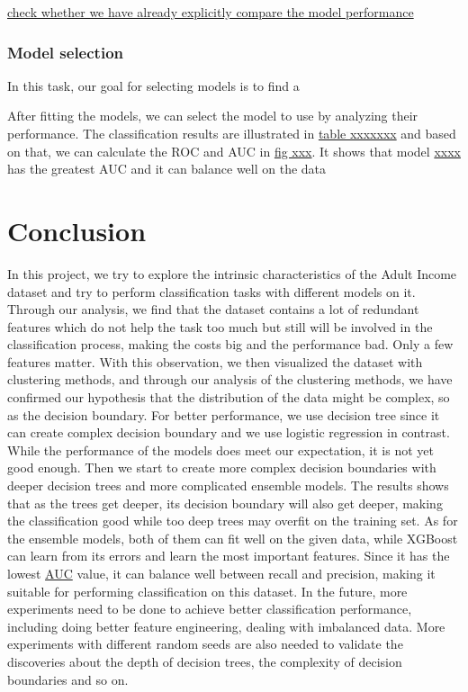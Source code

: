 \documentclass{article}
\begin{document}
\underline{check whether we have already explicitly compare the model performance}

\subsubsection*{Model selection}



In this task, our goal for selecting models is to find a 

After fitting the models, we can select the model to use by analyzing their performance. The classification results are illustrated in \underline{table xxxxxxx} and based on that, we can calculate the ROC and AUC in \underline{fig xxx}. It shows that model \underline{xxxx} has the greatest AUC and it can balance well on the data


\section{Conclusion}

In this project, we try to explore the intrinsic characteristics of the Adult Income dataset and try to perform classification tasks with different models on it. Through our analysis, we find that the dataset contains a lot of redundant features which do not help the task too much but still will be involved in the classification process, making the costs big and the performance bad. Only a few features matter. With this observation, we then visualized the dataset with clustering methods, and through our analysis of the clustering methods, we have confirmed our hypothesis that the distribution of the data might be complex, so as the decision boundary. For better performance, we use decision tree since it can create complex decision boundary and we use logistic regression in contrast. While the performance of the models does meet our expectation, it is not yet good enough. Then we start to create more complex decision boundaries with deeper decision trees and more complicated ensemble models. The results shows that as the trees get deeper, its decision boundary will also get deeper, making the classification good while too deep trees may overfit on the training set. As for the ensemble models, both of them can fit well on the given data, while XGBoost can learn from its errors and learn the most important features. Since it has the lowest \underline{AUC} value, it can balance well between recall and precision, making it suitable for performing classification on this dataset. In the future, more experiments need to be done to achieve better classification performance, including doing better feature engineering, dealing with imbalanced data. More experiments with different random seeds are also needed to validate the discoveries about the depth of decision trees, the complexity of decision boundaries and so on.
\end{document}
